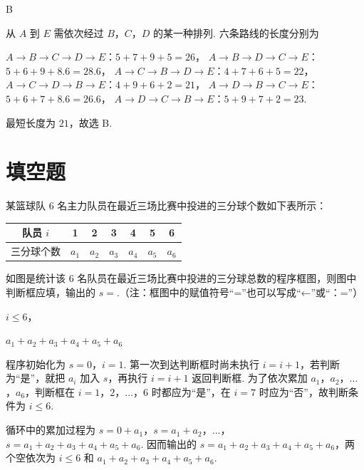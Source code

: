 \begin{answer}
B
\end{answer}

\begin{solution}
从 \(A\) 到 \(E\) 需依次经过 \(B\)，\(C\)，\(D\) 的某一种排列. 六条路线的长度分别为

\(A\to B\to C\to D\to E\)：\(5+7+9+5=26\)，
\(A\to B\to D\to C\to E\)：\(5+6+9+8.6=28.6\)，
\(A\to C\to B\to D\to E\)：\(4+7+6+5=22\)，
\(A\to C\to D\to B\to E\)：\(4+9+6+2=21\)，
\(A\to D\to B\to C\to E\)：\(5+6+7+8.6=26.6\)，
\(A\to D\to C\to B\to E\)：\(5+9+7+2=23\).

最短长度为 \(21\)，故选 B.
\end{solution}

\section{填空题}

\begin{problem}
某篮球队 6 名主力队员在最近三场比赛中投进的三分球个数如下表所示：
\begin{center}
\begin{tabular}{|c|c|c|c|c|c|c|}
\hline
队员 \(i\) & 1 & 2 & 3 & 4 & 5 & 6 \\
\hline
三分球个数 & \(a_1\) & \(a_2\) & \(a_3\) & \(a_4\) & \(a_5\) & \(a_6\) \\
\hline
\end{tabular}
\end{center}
如图是统计该 6 名队员在最近三场比赛中投进的三分球总数的程序框图，则图中判断框应填\fillinblank{}，输出的 \(s=\)\fillinblank{}.（注：框图中的赋值符号“=”也可以写成“←”或“：=”）

\begingroup
\problemresetlayout
{}
\endgroup
\end{problem}

\begin{answer}
\(i\leqslant 6\)，

\(a_1+a_2+a_3+a_4+a_5+a_6\)
\end{answer}

\begin{solution}
程序初始化为 \(s=0\)，\(i=1\). 第一次到达判断框时尚未执行 \(i=i+1\)，若判断为“是”，就把 \(a_i\) 加入 \(s\)，再执行 \(i=i+1\) 返回判断框. 为了依次累加 \(a_1\)，\(a_2\)，\(\ldots\)，\(a_6\)，判断框在 \(i=1\)，\(2\)，\(\ldots\)，\(6\) 时都应为“是”，在 \(i=7\) 时应为“否”，故判断条件为 \(i\leqslant6\).

循环中的累加过程为
\(s=0+a_1\)，\(s=a_1+a_2\)，\(\ldots\)，\(s=a_1+a_2+a_3+a_4+a_5+a_6\). 因而输出的 \(s=a_1+a_2+a_3+a_4+a_5+a_6\)，两个空依次为 \(i\leqslant6\) 和 \(a_1+a_2+a_3+a_4+a_5+a_6\).
\end{solution}

